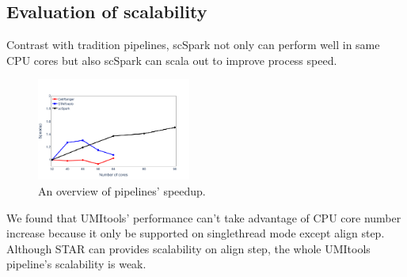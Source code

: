 \documentclass[conference]{IEEEtran}
\begin{document}

\subsection{Evaluation of scalability} 
Contrast with tradition pipelines, scSpark not only can perform well in same CPU cores but also scSpark can scala out to improve process speed.
\begin{figure}
	\centering
	\includegraphics[width=0.45\textwidth]{fig5.pdf}
	\caption{An overview of pipelines' speedup.} \label{fig5}
\end{figure}
We found that UMI\-tools' performance can't take advantage of CPU core number increase because it only be supported on single\-thread mode except align step.
Although STAR can provides scalability on align step, the whole UMI\-tools pipeline's scalability is weak.
\end{document}
